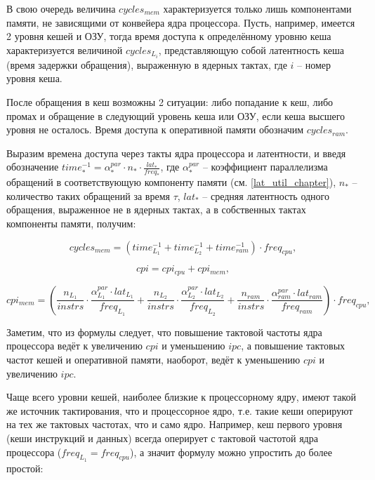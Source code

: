     В свою очередь величина $cycles_{mem}$ характеризуется только лишь компонентами памяти,
    не зависящими от конвейера ядра процессора. Пусть, например, имеется 2 уровня кешей
    и ОЗУ, тогда время доступа к определённому уровню кеша характеризуется величиной $cycles_{L_{i}}$,
    представляющую собой латентность кеша (время задержки обращения), выраженную в ядерных тактах,
    где $i$ -- номер уровня кеша.

    После обращения в кеш возможны 2 ситуации: либо попадание к кеш, либо промах и обращение в
    следующий уровень кеша или ОЗУ, если кеша высшего уровня не осталось.
    Время доступа к оперативной памяти обозначим $cycles_{ram}$.

    Выразим времена доступа через такты ядра процессора и латентности, и введя обозначение
    $time^{-1}_{*} = \alpha_{*}^{par} \cdot n_{*} \cdot \frac{lat_{*}}{freq_{*}}$, где
    $\alpha_{*}^{par}$ --
    коэффициент параллелизма обращений в соответствующую компоненту памяти (см. \ref{lat_util_chapter}),
    $n_{*}$ -- количество таких обращений за время $\tau$, $lat_{*}$ -- средняя латентность
    одного обращения, выраженное не в ядерных тактах, а в собственных тактах компоненты памяти, получим:

    \begin{equation}
        cycles_{mem} = \left( time^{-1}_{L_1} + time^{-1}_{L_2} + time^{-1}_{ram} \right) \cdot freq_{cpu},
    \end{equation}

    \begin{equation}
        cpi = cpi_{cpu} + cpi_{mem},
    \end{equation}

    \begin{equation}
        cpi_{mem} = \left( \frac{n_{L_1}}{instrs} \cdot \frac{\alpha_{L_1}^{par} \cdot lat_{L_1}}{freq_{L_1}} +
        \frac{n_{L_2}}{instrs} \cdot \frac{\alpha_{L_2}^{par} \cdot lat_{L_2}}{freq_{L_2}} +
        \frac{n_{ram}}{instrs} \cdot \frac{\alpha_{ram}^{par} \cdot lat_{ram}}{freq_{ram}} \right) \cdot freq_{cpu},
    \end{equation}

    Заметим, что из формулы следует, что повышение тактовой частоты ядра процессора ведёт к
    увеличению $cpi$ и уменьшению $ipc$, а повышение тактовых частот кешей и оперативной памяти,
    наоборот, ведёт к уменьшению $cpi$ и увеличению $ipc$.

    Чаще всего уровни кешей, наиболее близкие к процессорному ядру, имеют такой же источник
    тактирования, что и процессорное ядро, т.е. такие кеши оперируют на тех же тактовых частотах,
    что и само ядро. Например, кеш первого уровня (кеши инструкций и данных) всегда оперирует с
    тактовой частотой ядра процессора ($freq_{L_1} = freq_{cpu}$), а значит формулу можно упростить
    до более простой:

